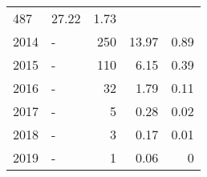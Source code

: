 \begin{longtable}{lXrrr}
       \num{487} &
       \num[round-mode=places,round-precision=2]{27.22} &
         \num[round-mode=places,round-precision=2]{1.73} \\

     2014 &
     \multicolumn{1}{X}{ -  } &


       \num{250} &
       \num[round-mode=places,round-precision=2]{13.97} &
         \num[round-mode=places,round-precision=2]{0.89} \\

     2015 &
     \multicolumn{1}{X}{ -  } &


       \num{110} &
       \num[round-mode=places,round-precision=2]{6.15} &
         \num[round-mode=places,round-precision=2]{0.39} \\

     2016 &
     \multicolumn{1}{X}{ -  } &


       \num{32} &
       \num[round-mode=places,round-precision=2]{1.79} &
         \num[round-mode=places,round-precision=2]{0.11} \\

     2017 &
     \multicolumn{1}{X}{ -  } &


       \num{5} &
       \num[round-mode=places,round-precision=2]{0.28} &
         \num[round-mode=places,round-precision=2]{0.02} \\

     2018 &
     \multicolumn{1}{X}{ -  } &


       \num{3} &
       \num[round-mode=places,round-precision=2]{0.17} &
         \num[round-mode=places,round-precision=2]{0.01} \\

     2019 &
     \multicolumn{1}{X}{ -  } &


       \num{1} &
       \num[round-mode=places,round-precision=2]{0.06} &
         \num[round-mode=places,round-precision=2]{0} \\


\end{longtable}
